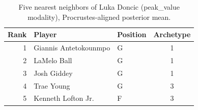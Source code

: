 \begin{table}[htbp]
  \centering\small
  \begin{tabular}{rllc}
    \toprule
    Rank & Player & Position & Archetype \\
    \midrule
    1 & Giannis Antetokounmpo & G & 1 \\
    2 & LaMelo Ball & G & 1 \\
    3 & Josh Giddey & G & 1 \\
    4 & Trae Young & G & 3 \\
    5 & Kenneth Lofton Jr. & F & 3 \\
    \bottomrule
  \end{tabular}
  \caption{Five nearest neighbors of Luka Doncic (peak_value modality), Procrustes-aligned posterior mean.}
  \label{tab:Luka_Doncic_neighbors_peak_value}
\end{table}

